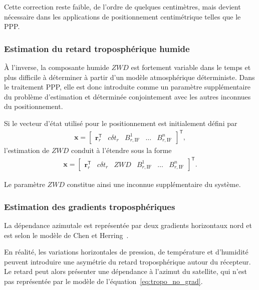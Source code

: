 Cette correction reste faible, de l'ordre de quelques centimètres, mais devient nécessaire dans les applications de positionnement centimétrique telles que le PPP.

\subsubsection{Estimation du retard troposphérique humide}

À l'inverse, la composante humide $ZWD$ est fortement variable dans le temps
et plus difficile à déterminer à partir d'un modèle atmosphérique
déterministe. Dans le traitement PPP, elle est donc introduite comme un paramètre supplémentaire du
problème d'estimation et déterminée conjointement avec les autres inconnues
du positionnement.

Si le vecteur d'état utilisé pour le positionnement est initialement défini
par
\begin{align}
\mathbf x
=
\begin{bmatrix}
\mathbf r_r^{\mathsf T} & c\delta t_r &
B_{r,\mathrm{IF}}^1 & \ldots & B_{r,\mathrm{IF}}^n
\end{bmatrix}^{\mathsf T},
\end{align}
l'estimation de $ZWD$ conduit à l'étendre sous la forme
\begin{align}
\mathbf x
=
\begin{bmatrix}
\mathbf r_r^{\mathsf T} & c\delta t_r & ZWD &
B_{r,\mathrm{IF}}^1 & \ldots & B_{r,\mathrm{IF}}^n
\end{bmatrix}^{\mathsf T}.
\label{eq:state_zwd}
\end{align}

Le paramètre $ZWD$ constitue ainsi une inconnue supplémentaire du système.

\subsubsection{Estimation des gradients troposphériques}

La dépendance azimutale est représentée par deux gradients horizontaux nord et
est selon le modèle de Chen et Herring~\cite{chenHerring1997}.

En réalité, les variations horizontales de pression, de température et
d'humidité peuvent introduire une asymétrie du retard troposphérique autour
du récepteur. Le retard peut alors présenter une dépendance à l'azimut du
satellite, qui n'est pas représentée par le modèle
de l'équation~\eqref{eq:tropo_no_grad}.

